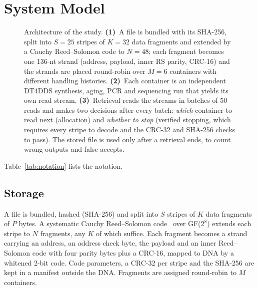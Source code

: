\documentclass[acmsmall,screen]{acmart}
\begin{document}
\section{System Model}\label{sec:model}
\begin{figure}[t]
\centering
\resizebox{\textwidth}{!}{}
\caption{Architecture of the study.  \textbf{(1)}~A file is bundled with its SHA-256, split into $S{=}25$
stripes of $K{=}32$ data fragments and extended by a Cauchy Reed--Solomon code to $N{=}48$; each fragment
becomes one 136-nt strand (address, payload, inner RS parity, CRC-16) and the strands are placed
round-robin over $M{=}6$ containers with different handling histories.  \textbf{(2)}~Each container is an
independent DT4DDS synthesis, aging, PCR and sequencing run that yields its own read stream.
\textbf{(3)}~Retrieval reads the streams in batches of 50 reads and makes two decisions after every batch:
\emph{which} container to read next (allocation) and \emph{whether to stop} (verified stopping, which
requires every stripe to decode and the CRC-32 and SHA-256 checks to pass).  The stored file is used only
after a retrieval ends, to count wrong outputs and false accepts.}
\label{fig:arch}
\end{figure}

Table~\ref{tab:notation} lists the notation.


\subsection{Storage}
A file is bundled, hashed (SHA-256) and split into $S$ stripes of $K$ data fragments of $P$
bytes.  A systematic Cauchy Reed--Solomon code~\cite{reed1960polynomial} over GF($2^8$) extends
each stripe to $N$ fragments, any $K$ of which suffice.  Each fragment becomes a strand carrying
an address, an address check byte, the payload and an inner Reed--Solomon code with four parity
bytes plus a CRC-16, mapped to DNA by a whitened 2-bit code.  Code parameters, a CRC-32 per
stripe and the SHA-256 are kept in a manifest outside the DNA.  Fragments are assigned
round-robin to $M$ containers.
\end{document}
